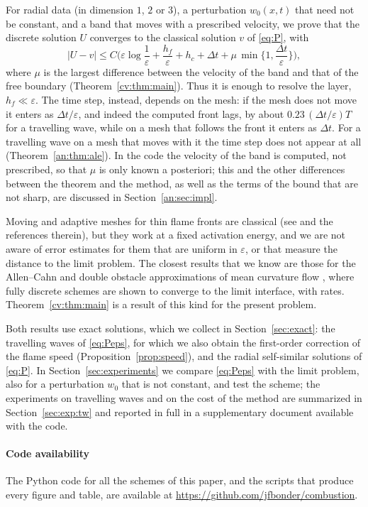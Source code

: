 \documentclass[11pt]{amsart}
\theoremstyle{definition}
\theoremstyle{remark}
\newcommand{\ve}{\varepsilon}
\begin{document}
For radial data (in dimension $1$, $2$ or $3$), a perturbation $w_0(x,t)$ that need not be
constant, and a band that moves with a prescribed velocity, we prove that the discrete
solution $U$ converges to the classical solution $v$ of \eqref{eq:P}, with
\[
|U-v|\le C\Big(\ve\log\frac1\ve+\frac{h_f}\ve+h_c+\Delta t+\mu\,\min\Big\{1,\frac{\Delta t}\ve\Big\}\Big),
\]
where $\mu$ is the largest difference between the velocity of the band and that of the
free boundary (Theorem~\ref{cv:thm:main}). Thus it is enough to resolve the layer,
$h_f\ll\ve$. The time step, instead, depends on the mesh: if the mesh does not move it
enters as $\Delta t/\ve$, and indeed the computed front lags, by about
$0.23\,(\Delta t/\ve)T$ for a travelling wave, while on a mesh that follows the front it
enters as $\Delta t$. For a travelling wave on a mesh that moves with it the time step
does not appear at all (Theorem~\ref{an:thm:ale}). In the code the velocity of the band
is computed, not prescribed, so that $\mu$ is only known a posteriori; this and the
other differences between the theorem and the method, as well as the terms of the bound
that are not sharp, are discussed in Section~\ref{an:sec:impl}.

Moving and adaptive meshes for thin flame fronts are classical (see
\cite{HuangRussell2011} and the references therein), but they work at a fixed
activation energy, and we are not aware of error estimates for them that are uniform in
$\ve$, or that measure the distance to the limit problem. The closest results that we
know are those for the Allen--Cahn and double obstacle approximations of mean curvature
flow \cite{NochettoVerdi1996,NochettoVerdi1997}, where fully discrete schemes are shown
to converge to the limit interface, with rates. Theorem~\ref{cv:thm:main} is a result of
this kind for the present problem.

Both results use exact solutions, which we collect in Section~\ref{sec:exact}: the
travelling waves of \eqref{eq:Peps}, for which we also obtain the first-order correction
of the flame speed (Proposition~\ref{prop:speed}), and the radial self-similar
solutions of \eqref{eq:P}. In Section~\ref{sec:experiments} we compare \eqref{eq:Peps}
with the limit problem, also for a perturbation $w_0$ that is not constant, and test the
scheme; the experiments on travelling waves and on the cost of the method are summarized in
Section~\ref{sec:exp:tw} and reported in full in a supplementary document available
with the code.

\paragraph{Code availability} The Python code for all the schemes of this paper, and
the scripts that produce every figure and table, are available at
\url{https://github.com/jfbonder/combustion}.
\end{document}
